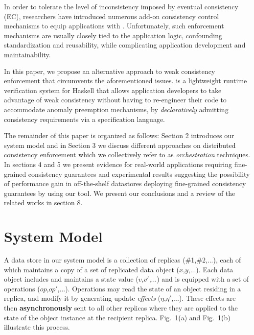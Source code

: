 \documentclass[authorversion]{sig-alternate-05-2015}
\begin{document}
In order to tolerate the level of inconsistency imposed by eventual consistency (EC), researchers have introduced  
numerous add-on consistency control mechanisms to equip applications with \cite{terry,lloyd,ahmad,Bailis:2013:HAT,Bailis:2014:RAMP}.
Unfortunately, such enforcement
mechanisms are usually closely tied to the application logic, confounding
standardization and reusability, while complicating application development and maintainability.

In this paper, we propose an alternative approach to weak consistency
enforcement that circumvents the aforementioned issues. \tool\; is a
lightweight runtime verification system for Haskell that allows
application developers to take advantage of weak consistency without
having to re-engineer their code to accommodate anomaly preemption
mechanisms, by \emph{declaratively} admitting consistency
requirements via a specification language.

The remainder of this paper is organized as follows:
Section 2 introduces our system model and in Section 3 we 
discuss different approaches on distributed consistency enforcement which we
collectively refer to as \emph{orchestration} techniques. In sections 4 and 5 we present
evidence for real-world applications requiring fine-grained consistency guarantees and 
experimental results suggesting the possibility of performance gain in off-the-shelf datastores deploying fine-grained consistency guarantees by using our tool. 
We present our conclusions and a review of the related works in section 8.



\section{System Model}
A data store in our system model is a collection of replicas (\#1,\#2,...), each of
which maintains a copy of a set of replicated data object ($x$,$y$,...). 
Each data object includes and maintains a state value ($v$,$v'$,...) and is equipped with a set of 
operations ($op$,$op'$,...). Operations may read the state of an object residing 
in a replica, and modify it by generating update \emph{effects} ($\eta$,$\eta'$,...). 
These effects are then {\bf asynchronously} sent to all other replicas where they are applied to the state 
of the object instance at the recipient replica. 
Fig.~1(a) and Fig.~1(b) illustrate this process.
\end{document}
